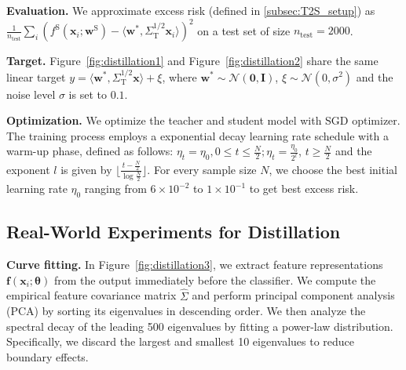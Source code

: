 \documentclass{article}
\theoremstyle{definition}
\theoremstyle{definition}
\theoremstyle{plain}
\theoremstyle{plain}
\theoremstyle{plain}
\theoremstyle{plain}
\theoremstyle{plain}
\begin{document}
\textbf{Evaluation.} We approximate excess risk (defined in \ref{subsec:T2S_setup}) as $\frac{1}{n_{\mathrm{test}}}\sum_i \left(f^{\mathrm{S}}(\mathbf{x}_i;\mathbf{w}^{\mathrm{S}})-\langle \mathbf{w}^{*}, \Sigma_{\mathrm{T}}^{1/2} \mathbf{x}_i \rangle \right)^2$ on a test set of size $n_{\mathrm{test}}=2000$.

\textbf{Target.} Figure~\ref{fig:distillation1} and Figure~\ref{fig:distillation2} share the same linear target $y =\langle \mathbf{w}^*, \Sigma_{\mathrm{T}}^{1/2}\mathbf{x}\rangle + \xi$, where $\mathbf{w}^* \sim \mathcal{N}(\mathbf{0},\mathbf{I})$, $\xi \sim \mathcal{N}(0,\sigma^2 )$ and the noise level $\sigma$ is set to $0.1$. 




\textbf{Optimization.} We optimize the teacher and student model with SGD optimizer. The training process employs a exponential decay learning rate schedule with a warm-up phase, defined as follows: $\eta_t = \eta_0, 0 \leq t \leq \frac{N}{2}; \eta_t = \frac{\eta_0}{2^l}$, $t\geq \frac{N}{2}$ and the exponent $l$ is given by $\lfloor\frac{t-\frac{N}{2}}{\log\frac{N}{2}}\rfloor$. For every sample size $N$, we choose the best initial learning rate $\eta_0$ ranging from $6\times 10^{-2}$ to $1\times 10^{-1}$ to get best excess risk. 

\subsection{Real-World Experiments for Distillation} 

\textbf{Curve fitting.}
In Figure~\ref{fig:distillation3}, we extract feature representations $\mathbf{f}(\mathbf{x}_i; \boldsymbol{\theta})$ from the  output immediately before the classifier. We compute the empirical feature covariance matrix $\hat{\Sigma}$ and perform principal component analysis (PCA) by sorting its eigenvalues in descending order. We then analyze the spectral decay of the leading 500 eigenvalues by fitting a power-law distribution. Specifically, we discard the largest and smallest 10 eigenvalues to reduce boundary effects.
\end{document}
